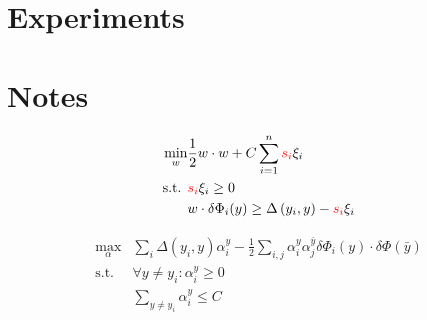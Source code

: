 \documentclass{IEEEtran}
\begin{document}
\section{Experiments}

\section{Notes}
\begin{align*}
    \min_w & \frac{1}{2} w \cdot w + C \sum_{i=1}^n \textcolor{red}{s_i} \xi_i \\
    \text{s.t. } & \textcolor{red}{s_i} \xi_i \ge 0 \\
    & w \cdot \delta \Phi_i(y) \ge \Delta\left(y_i, y\right) - \textcolor{red}{s_i} \xi_i
\end{align*}

\begin{align*}
    \max_\alpha & \sum_i \Delta\left(y_i, y\right) \alpha_i^y - \frac{1}{2} \sum_{i,j} \alpha_i^y
    \alpha_j^{\bar{y}} \delta \Phi_i(y) \cdot \delta \Phi(\bar{y}) \\
    \text{s.t. } & \forall y \ne y_i : \alpha_i^y \ge 0 \\
    & \sum_{y \ne y_i} \alpha_i^y \le C
\end{align*}

\newpage
\end{document}

